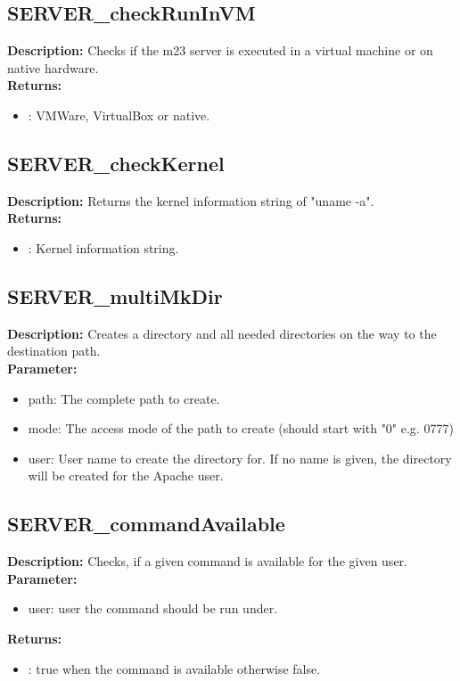 \subsection{SERVER\_checkRunInVM}
\textbf{Description:} Checks if the m23 server is executed in a virtual machine or on native hardware.\\
\textbf{Returns:}
\begin{itemize}
\item : VMWare, VirtualBox or native.
\end{itemize}

\subsection{SERVER\_checkKernel}
\textbf{Description:} Returns the kernel information string of "uname -a".\\
\textbf{Returns:}
\begin{itemize}
\item : Kernel information string.
\end{itemize}

\subsection{SERVER\_multiMkDir}
\textbf{Description:} Creates a directory and all needed directories on the way to the destination path.\\
\textbf{Parameter:}
\begin{itemize}
\item path: The complete path to create.
\item mode: The access mode of the path to create (should start with "0" e.g. 0777)
\item user: User name to create the directory for. If no name is given, the directory will be created for the Apache user.
\end{itemize}

\subsection{SERVER\_commandAvailable}
\textbf{Description:} Checks, if a given command is available for the given user.\\
\textbf{Parameter:}
\begin{itemize}
\item user: user the command should be run under.
\end{itemize}
\textbf{Returns:}
\begin{itemize}
\item : true when the command is available otherwise false.
\end{itemize}

